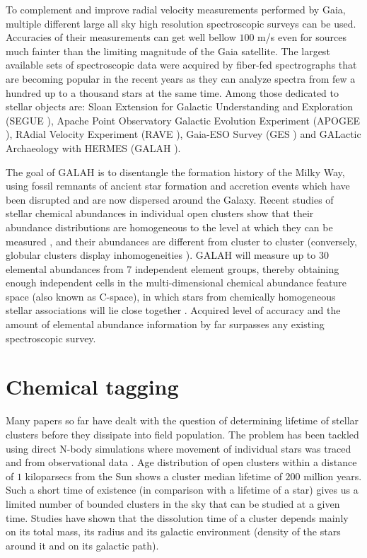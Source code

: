 To complement and improve radial velocity measurements performed by Gaia, multiple different large all sky high resolution spectroscopic surveys can be used. Accuracies of their measurements can get well bellow $100$ m/s even for sources much fainter than the limiting magnitude of the Gaia satellite. The largest available sets of spectroscopic data were acquired by fiber-fed spectrographs that are becoming popular in the recent years as they can analyze spectra from few a hundred up to a thousand stars at the same time. Among those dedicated to stellar objects are: Sloan Extension for Galactic Understanding and Exploration (SEGUE \cite{2009AJ....137.4377Y}), Apache Point Observatory Galactic Evolution Experiment (APOGEE \cite{2017AJ....154...94M}), RAdial Velocity Experiment (RAVE \cite{2017AJ....153...75K}), Gaia-ESO Survey (GES \cite{2012Msngr.147...25G}) and GALactic Archaeology with HERMES (GALAH \cite{2017MNRAS.465.3203M}).

The goal of GALAH is to disentangle the formation history of the Milky Way, using fossil remnants of ancient star formation and accretion events which have been disrupted and are now dispersed around the Galaxy. Recent studies of stellar chemical abundances in individual open clusters show that their abundance distributions are homogeneous to the level at which they can be measured \cite{2016ApJ...817...49B, 2016ApJ...833..262H}, and their abundances are different from cluster to cluster (conversely, globular clusters display inhomogeneities \cite{2007MNRAS.377..335B, 2012A&ARv..20...50G}). GALAH will measure up to 30 elemental abundances from 7 independent element groups, thereby obtaining enough independent cells in the multi-dimensional chemical abundance feature space (also known as C-space), in which stars from chemically homogeneous stellar associations will lie close together \cite{2012ASPC..458..393F}. Acquired level of accuracy and the amount of elemental abundance information by far surpasses any existing spectroscopic survey.


\section{Chemical tagging}
Many papers so far have dealt with the question of determining lifetime of stellar clusters before they dissipate into field population. The problem has been tackled using direct N-body simulations \citep{1998A&A...337..363P} where movement of individual stars was traced and from observational data \citep{1971Ap&SS..13..300W, 1988IAUS..126..393W}. Age distribution of open clusters within a distance of $1$ kiloparsecs from the Sun shows a cluster median lifetime of $200$ million years. Such a short time of existence (in comparison with a lifetime of a star) gives us a limited number of bounded clusters in the sky that can be studied at a given time. Studies have shown that the dissolution time of a cluster depends mainly on its total mass, its radius and its galactic environment (density of the stars around it and on its galactic path). 

